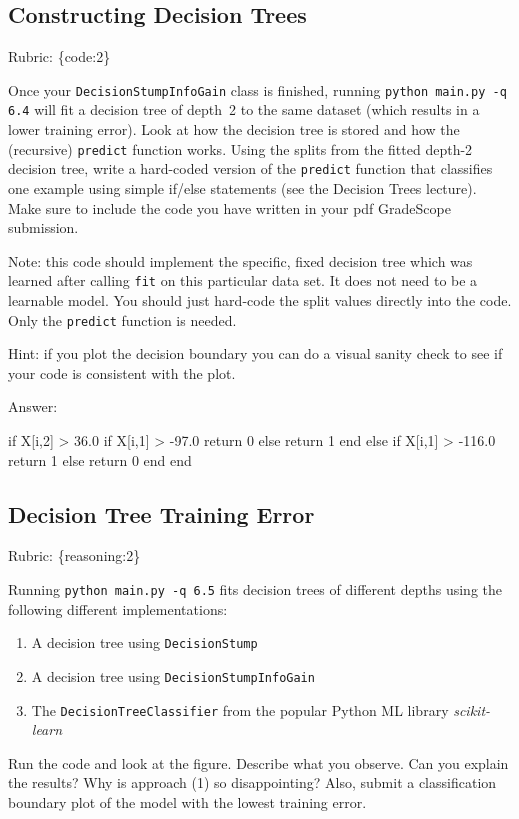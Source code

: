 \documentclass{article}
\def\rubric#1{\gre{Rubric: \{#1\}}}{}
\def\ans#1{\par\gre{Answer: #1}}
\def\blu#1{{\color{blu}#1}}
\def\gre#1{{\color{gre}#1}}
\def\enum#1{\begin{enumerate}#1\end{enumerate}}
\begin{document}
\subsection{Constructing Decision Trees}
\rubric{code:2}

Once your \texttt{DecisionStumpInfoGain} class is finished, running \texttt{python main.py -q 6.4} will fit
a decision tree of depth~2 to the same dataset (which results in a lower training error).
Look at how the decision tree is stored and how the (recursive) \texttt{predict} function works.
\blu{Using the splits from the fitted depth-2 decision tree, write a hard-coded version of the \texttt{predict}
function that classifies one example using simple if/else statements
(see the Decision Trees lecture).} Make sure to include the code you have written in your pdf GradeScope submission.

Note: this code should implement the specific, fixed decision tree
which was learned after calling \texttt{fit} on this particular data set. It does not need to be a learnable model.
You should just hard-code the split values directly into the code. Only the \texttt{predict} function is needed.

Hint: if you plot the decision boundary you can do a visual sanity check to see if your code is consistent with the plot.

\ans{}
\begin{python}
if X[i,2] > 36.0
if X[i,1] > -97.0
return 0
else
return 1
end
else
if X[i,1] > -116.0
return 1
else
return 0
end
end
\end{python}




\subsection{Decision Tree Training Error}
\rubric{reasoning:2}

Running \texttt{python main.py -q 6.5} fits decision trees of different depths using the following different implementations: 
\enum{
\item A decision tree using \texttt{DecisionStump}
\item A decision tree using \texttt{DecisionStumpInfoGain}
\item The \texttt{DecisionTreeClassifier} from the popular Python ML library \emph{scikit-learn}
}

Run the code and look at the figure.
\blu{Describe what you observe. Can you explain the results?} Why is approach (1) so disappointing? Also, \blu{submit a classification boundary plot of the model with the lowest training error}.
\end{document}
